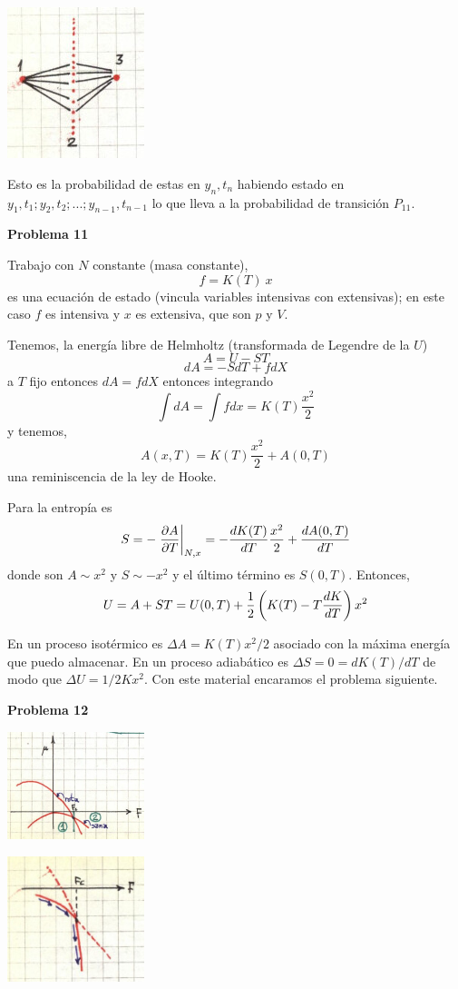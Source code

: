 \documentclass[10pt,oneside]{CBFT_book}
\begin{document}
\includegraphics[width=0.30\textwidth]{images/1606329125.jpg}

Esto es la probabilidad de estas en $y_n,t_n$ habiendo estado en $y_1,t_1;y_2,t_2;...;y_{n-1},t_{n-1}$
lo que lleva a la probabilidad de transición $P_{11}$.


\begin{ejemplo}{\bf Problema 11}

Trabajo con $N$ constante (masa constante),
\[
	f = K(T) \: x
\]
es una ecuación de estado (vincula variables intensivas con extensivas); en este caso $f$ es intensiva
y $x$ es extensiva, que son $p$ y $V$.

Tenemos, la energía libre de Helmholtz (transformada de Legendre de la $U$)
\[
	A = U -S T
\]
\[
	dA = - S dT + f dX
\]
a $T$ fijo entonces $dA = f dX$ entonces integrando
\[
	\int dA = \int f dx = K(T) \frac{x^2}{2}
\]
y tenemos,
\[
	A(x,T) = K(T) \frac{x^2}{2} + A(0,T)
\]
una reminiscencia de la ley de Hooke.

Para la entropía es 
\[
	S = - \left.\frac{\partial^{\hspace{-0.05em}} {A}}{\partial {T}^{\hspace{-0.05em}}}\right|_{N,x} = - \frac{d^{\hspace{-0.05em}} {K(T)}}{d {T}^{\hspace{-0.05em}}} \frac{x^2}{2} + \frac{d^{\hspace{-0.05em}} {A(0,T)}}{d {T}^{\hspace{-0.05em}}}
\]
donde son $A \sim x^2$ y $S \sim -x^2$ y el último término es $S(0,T)$.
Entonces,
\[
	U = A + S T = U(0,T) + \frac{1}{2}\left( K(T) - T \frac{d^{\hspace{-0.05em}} {K}}{d {T}^{\hspace{-0.05em}}} \right) x^2
\]

En un proceso isotérmico es $\Delta A = K(T) x^2/2$ asociado con la máxima energía que  puedo
almacenar.
En un proceso adiabático es $\Delta S = 0 = dK(T)/dT$ de modo que $\Delta U = 1/2 K x^2$.
Con este material encaramos el problema siguiente.
 
\end{ejemplo}

\begin{ejemplo}{\bf Problema 12}

\includegraphics[width=0.30\textwidth]{images/1606329132.jpg}

\includegraphics[width=0.30\textwidth]{images/1606329139.jpg}
 
\end{ejemplo}
\end{document}
